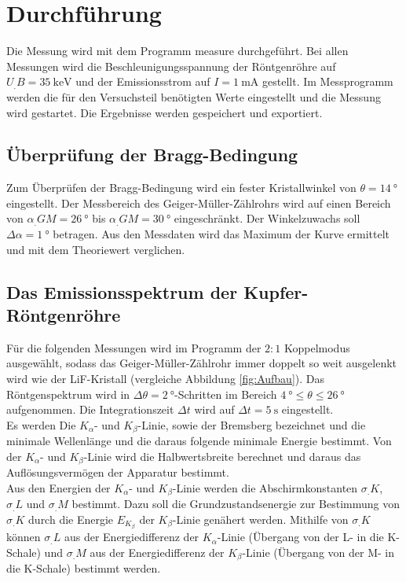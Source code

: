 
\section{Durchführung}
\label{sec:Durchführung}

Die Messung wird mit dem Programm measure durchgeführt.
Bei allen Messungen wird die Beschleunigungsspannung der Röntgenröhre auf $U_.B = \SI{35}{\kilo\electronvolt}$ und der Emissionsstrom auf $I = \SI{1}{\milli\ampere}$ gestellt. Im Messprogramm werden die für den Versuchsteil benötigten Werte eingestellt und die Messung wird gestartet. Die Ergebnisse werden gespeichert und exportiert.

\subsection{Überprüfung der Bragg-Bedingung}

Zum Überprüfen der Bragg-Bedingung wird ein fester Kristallwinkel von $\theta = \SI{14}{\degree}$ eingestellt. Der Messbereich des Geiger-Müller-Zählrohrs wird auf einen Bereich von $\alpha_.{GM} = \SI{26}{\degree}$ bis $\alpha_.{GM} = \SI{30}{\degree}$ eingeschränkt. Der Winkelzuwachs soll $\Delta\alpha = \SI{1}{\degree}$ betragen.
Aus den Messdaten wird das Maximum der Kurve ermittelt und mit dem Theoriewert verglichen.

\subsection{Das Emissionsspektrum der Kupfer-Röntgenröhre}

Für die folgenden Messungen wird im Programm der $2:1$ Koppelmodus ausgewählt, sodass das Geiger-Müller-Zählrohr immer doppelt so weit ausgelenkt wird wie der LiF-Kristall (vergleiche Abbildung \ref{fig:Aufbau}).
Das Röntgenspektrum wird in $\Delta\theta = \SI{2}{\degree}$-Schritten im Bereich $\SI{4}{\degree} \leq \theta \leq \SI{26}{\degree}$ aufgenommen. Die Integrationszeit $\Delta t$ wird auf $\Delta t=\SI{5}{\second}$ eingestellt.\\ 
Es werden Die $K_\alpha$- und $K_\beta$-Linie, sowie der Bremsberg bezeichnet und die minimale Wellenlänge und die daraus folgende minimale Energie bestimmt.
Von der $K_\alpha$- und $K_\beta$-Linie wird die Halbwertsbreite berechnet und daraus das Auflösungsvermögen der Apparatur bestimmt.\\
Aus den Energien der $K_\alpha$- und $K_\beta$-Linie werden die Abschirmkonstanten $\sigma_.K$, $\sigma_.L$ und $\sigma_.M$ bestimmt. Dazu soll die Grundzustandsenergie zur Bestimmung von $\sigma_.K$ durch die Energie $E_{K_\beta}$ der $K_\beta$-Linie genähert werden. Mithilfe von $\sigma_.K$ können $\sigma_.L$ aus der Energiedifferenz der $K_\alpha$-Linie (Übergang von der L- in die K-Schale) und $\sigma_.M$ aus der Energiedifferenz der $K_\beta$-Linie (Übergang von der M- in die K-Schale) bestimmt werden.

